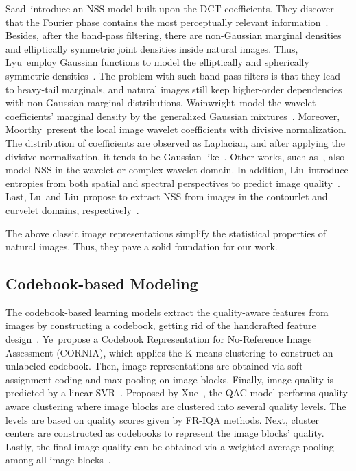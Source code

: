 Saad~\etal introduce an NSS model built upon the DCT coefficients. They discover that the Fourier phase contains the most perceptually relevant information~\citep{saad2012blind, saad2010dct}. Besides, after the band-pass filtering, there are non-Gaussian marginal densities and elliptically symmetric joint densities inside natural images. Thus, Lyu~\etal employ Gaussian functions to model the elliptically and spherically symmetric densities~\citep{lyu2008nonlinear}. The problem with such band-pass filters is that they lead to heavy-tail marginals, and natural images still keep higher-order dependencies with non-Gaussian marginal distributions. Wainwright~\etal model the wavelet coefficients' marginal density by the generalized Gaussian mixtures~\citep{wainwright1999scale}. Moreover, Moorthy~\etal present the local image wavelet coefficients with divisive normalization. The distribution of coefficients are observed as Laplacian, and after applying the divisive normalization, it tends to be Gaussian-like~\citep{moorthy2011blind}. Other works, such as~\citep{moorthy2010two, tang2011learning, gao2013universal, zhang2014c}, also model NSS in the wavelet or complex wavelet domain. In addition, Liu~\etal introduce entropies from both spatial and spectral perspectives to predict image quality~\citep{liu2014no}. Last, Lu~\etal and Liu~\etal propose to extract NSS from images in the contourlet and curvelet domains, respectively~\citep{lu2010no, liu2014no}.

The above classic image representations simplify the statistical properties of natural images. Thus, they pave a solid foundation for our work.

\subsection{Codebook-based Modeling}
The codebook-based learning models extract the quality-aware features from images by constructing a codebook, getting rid of the handcrafted feature design~\citep{ghadiyaram2017perceptual, xu2016blind, ye2012unsupervised, xue2014blind, ye2012no, xue2013learning, zhang2015som}. Ye~\etal propose a Codebook Representation for No-Reference Image Assessment (CORNIA), which applies the K-means clustering to construct an unlabeled codebook. Then, image representations are obtained via soft-assignment coding and max pooling on image blocks. Finally, image quality is predicted by a linear SVR~\citep{ye2012unsupervised, xu2016blind, zhang2015som}. Proposed by Xue~\etal, the QAC model performs quality-aware clustering where image blocks are clustered into several quality levels. The levels are based on quality scores given by FR-IQA methods. Next, cluster centers are constructed as codebooks to represent the image blocks' quality. Lastly, the final image quality can be obtained via a weighted-average pooling among all image blocks~\citep{xue2013learning}.